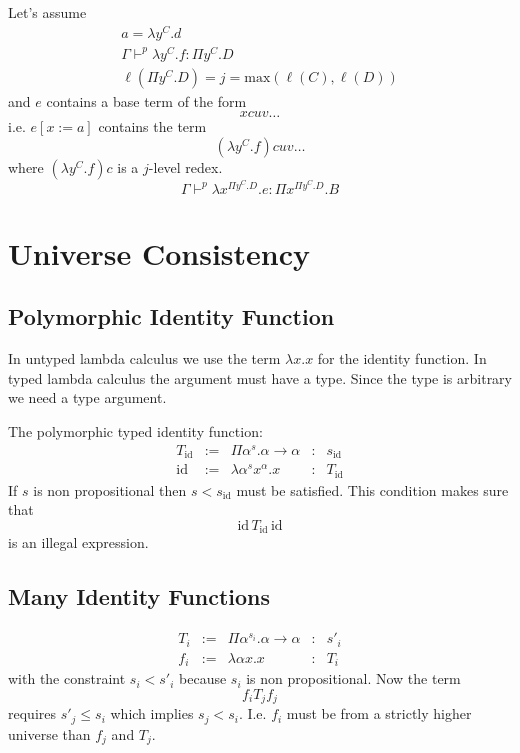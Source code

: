 Let's assume
$$
\begin{array}{l}
  a = \lambda y^C.d
  \\
  \Gamma \vdash^p \lambda y^C.f: \Pi y^C.D
  \\
  \ell(\Pi y^C.D) = j = \text{max}(\ell(C), \ell(D))
\end{array}
$$
and $e$ contains a base term of the form
$$
x c u v \ldots
$$
i.e. $e[x:=a]$ contains the term
$$
(\lambda y^C.f) c u v \ldots
$$
where $(\lambda y^C.f) c$ is a $j$-level redex.
$$
\Gamma \vdash^p \lambda x^{\Pi y^C.D}.e : \Pi x^{\Pi y^C.D}. B
$$


\section{Universe Consistency}

\subsection{Polymorphic Identity Function}

In untyped lambda calculus we use the term $\lambda x.x$ for the identity
function. In typed lambda calculus the argument must have a type. Since the
type is arbitrary we need a type argument.

{\def\id{\text{id}}

  The polymorphic typed identity function:
  $$
  \begin{array}{lllll}
    T_\id &:=& \Pi \alpha^s. \alpha \to \alpha &:& s_\id
    \\
    \id &:=& \lambda \alpha^s x^\alpha . x &:& T_\id
  \end{array}
  $$
  If $s$ is non propositional then $s < s_\id$ must be satisfied. This
  condition makes sure that
  $$
  \id \, T_\id \, \id
  $$
  is an illegal expression.
}



\subsection{Many Identity Functions}


$$
\begin{array}{lllll}
  T_i &:=& \Pi \alpha^{s_i}. \alpha \to \alpha  &:& s'_i
  \\
  f_i &:=& \lambda \alpha x . x &:& T_i
\end{array}
$$
with the constraint $s_i < s'_i$ because $s_i$ is non propositional. Now the
term
$$
  f_i T_j f_j
$$
requires $s'_j \le s_i$ which implies $s_j < s_i$. I.e. $f_i$ must be from a
strictly higher universe than $f_j$ and $T_j$.





